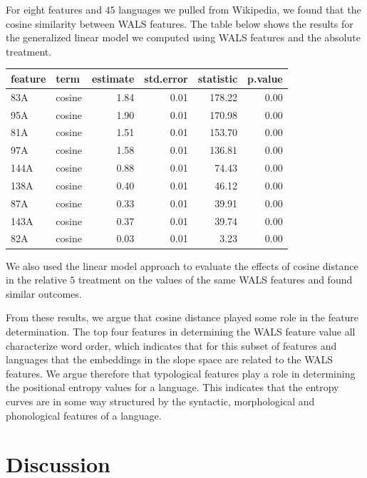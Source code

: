 \documentclass[10pt, letterpaper]{article}
\begin{document}
For eight features and \(45\) languages we pulled from Wikipedia, we
found that the cosine similarity between WALS features. The table below
shows the results for the generalized linear model we computed using
WALS features and the absolute treatment.

\begin{table}[tb]
\centering
\begin{tabular}{llrrrr}
  \hline
feature & term & estimate & std.error & statistic & p.value \\ 
  \hline
83A & cosine & 1.84 & 0.01 & 178.22 & 0.00 \\ 
  95A & cosine & 1.90 & 0.01 & 170.98 & 0.00 \\ 
  81A & cosine & 1.51 & 0.01 & 153.70 & 0.00 \\ 
  97A & cosine & 1.58 & 0.01 & 136.81 & 0.00 \\ 
  144A & cosine & 0.88 & 0.01 & 74.43 & 0.00 \\ 
  138A & cosine & 0.40 & 0.01 & 46.12 & 0.00 \\ 
  87A & cosine & 0.33 & 0.01 & 39.91 & 0.00 \\ 
  143A & cosine & 0.37 & 0.01 & 39.74 & 0.00 \\ 
  82A & cosine & 0.03 & 0.01 & 3.23 & 0.00 \\ 
   \hline
\end{tabular}
\end{table}

We also used the linear model approach to evaluate the effects of cosine
distance in the relative \(5\) treatment on the values of the same WALS
features and found similar outcomes.

From these results, we argue that cosine distance played some role in
the feature determination. The top four features in determining the WALS
feature value all characterize word order, which indicates that for this
subset of features and languages that the embeddings in the slope space
are related to the WALS features. We argue therefore that typological
features play a role in determining the positional entropy values for a
language. This indicates that the entropy curves are in some way
structured by the syntactic, morphological and phonological features of
a language.

\hypertarget{discussion}{%
\section{Discussion}\label{discussion}}
\end{document}
